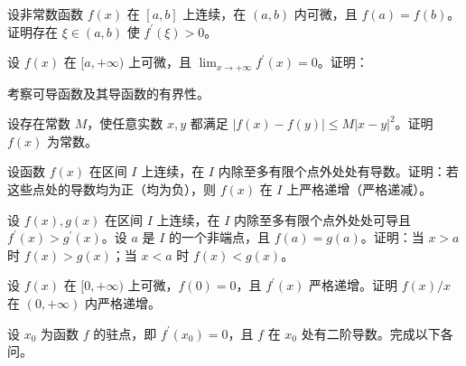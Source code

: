 \noindent\begin{minipage}{\textwidth}
设非常数函数 $f(x)$ 在 $[a,b]$ 上连续，在 $(a,b)$ 内可微，且 $f(a)=f(b)$。证明存在 $\xi\in(a,b)$ 使 $f^{\prime}(\xi)>0$。
\end{minipage}\par\vfill
\noindent\begin{minipage}{\textwidth}
设 $f(x)$ 在 $[a,+\infty)$ 上可微，且 $\lim_{x\to+\infty}f^{\prime}(x)=0$。证明：
\end{minipage}\par\vfill
\noindent\begin{minipage}{\textwidth}
考察可导函数及其导函数的有界性。
\end{minipage}\par\vfill
\newpage
\noindent\begin{minipage}{\textwidth}
设存在常数 $M$，使任意实数 $x,y$ 都满足 $|f(x)-f(y)|\le M|x-y|^2$。证明 $f(x)$ 为常数。
\end{minipage}\par\vfill
\noindent\begin{minipage}{\textwidth}
设函数 $f(x)$ 在区间 $I$ 上连续，在 $I$ 内除至多有限个点外处处有导数。证明：若这些点处的导数均为正（均为负），则 $f(x)$ 在 $I$ 上严格递增（严格递减）。
\end{minipage}\par\vfill
\noindent\begin{minipage}{\textwidth}
设 $f(x),g(x)$ 在区间 $I$ 上连续，在 $I$ 内除至多有限个点外处处可导且 $f^{\prime}(x)>g^{\prime}(x)$。设 $a$ 是 $I$ 的一个非端点，且 $f(a)=g(a)$。证明：当 $x>a$ 时 $f(x)>g(x)$；当 $x<a$ 时 $f(x)<g(x)$。
\end{minipage}\par\vfill
\noindent\begin{minipage}{\textwidth}
设 $f(x)$ 在 $[0,+\infty)$ 上可微，$f(0)=0$，且 $f^{\prime}(x)$ 严格递增。证明 $f(x)/x$ 在 $(0,+\infty)$ 内严格递增。
\end{minipage}\par\vfill
\newpage
\noindent\begin{minipage}{\textwidth}
设 $x_0$ 为函数 $f$ 的驻点，即 $f^{\prime}(x_0)=0$，且 $f$ 在 $x_0$ 处有二阶导数。完成以下各问。
\end{minipage}\par\vfill
